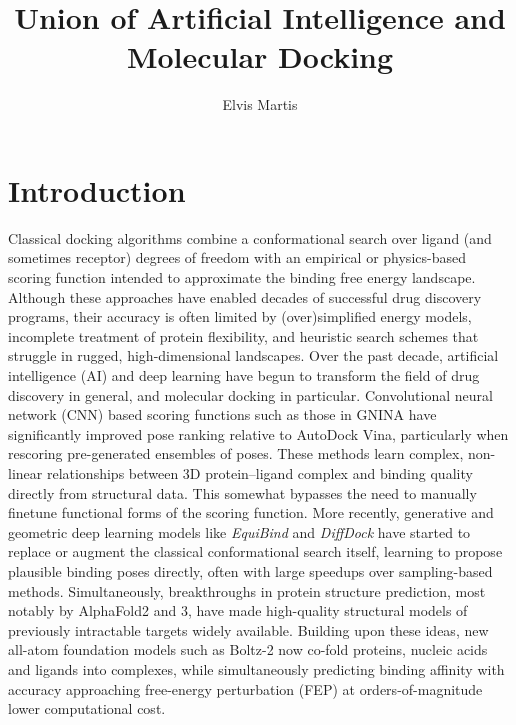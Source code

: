 \documentclass[12pt]{article}
\begin{document}
\title{Union of Artificial Intelligence and Molecular Docking}
\author{Elvis Martis}
\date{}
\maketitle


\section{Introduction}

Classical docking algorithms combine a conformational search over ligand (and sometimes receptor) degrees of freedom with an empirical or physics-based scoring function intended to approximate the binding free energy landscape. Although these approaches have enabled decades of successful drug discovery programs, their accuracy is often limited by (over)simplified energy models, incomplete treatment of protein flexibility, and heuristic search schemes that struggle in rugged, high-dimensional landscapes. Over the past decade, artificial intelligence (AI) and deep learning have begun to transform the field of drug discovery in general, and molecular docking in particular. Convolutional neural network (CNN) based scoring functions such as those in GNINA have significantly improved pose ranking relative to AutoDock Vina, particularly when rescoring pre-generated ensembles of poses.\cite{CH13_mcnutt2021gnina} These methods learn complex, non-linear relationships between 3D protein–ligand complex and binding quality directly from structural data. This somewhat bypasses the need to manually finetune functional forms of the scoring function.\cite{CH13_meli2022dlreview} More recently, generative and geometric deep learning models like \emph{EquiBind} and \emph{DiffDock} have started to replace or augment the classical conformational search itself, learning to propose plausible binding poses directly, often with large speedups over sampling-based methods.\cite{CH13_stark2022equibind,CH13_corso2022diffdock} Simultaneously, breakthroughs in protein structure prediction, most notably by AlphaFold2 and 3, have made high-quality structural models of previously intractable targets widely available.\cite{CH13_jumper2021alphafold} Building upon these ideas, new all-atom foundation models such as Boltz-2 now co-fold proteins, nucleic acids and ligands into complexes, while simultaneously predicting binding affinity with accuracy approaching free-energy perturbation (FEP) at orders-of-magnitude lower computational cost.\cite{CH13_passaro2025boltz2}
\end{document}
